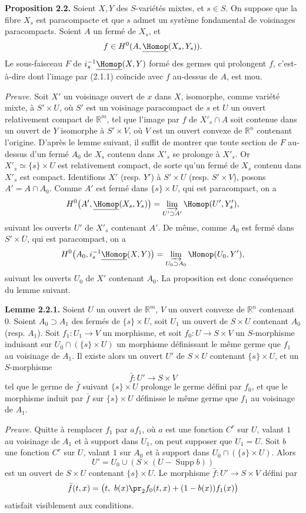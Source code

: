 \documentclass[11pt]{article}
\providecommand{\R}{\mathbb R}
\begin{document}
\textbf{Proposition 2.2.} Soient $X,Y$ des $S$-variétés mixtes, et $s\in S$. On suppose que la fibre $X_s$ est paracompacte et que $s$ admet un système fondamental de voisinages paracompacts. Soient $A$ un fermé de $X_s$, et
\[
  f\in H^0(A,\underline{\Homop}(X_s,Y_s)).
\]
Le sous-faisceau $F$ de $i_s^{-1}\underline{\Homop}(X,Y)$ formé des germes qui prolongent $f$, c'est-à-dire dont l'image par (2.1.1) coïncide avec $f$ au-dessus de $A$, est mou.

\emph{Preuve.} Soit $X'$ un voisinage ouvert de $x$ dans $X$, isomorphe, comme variété mixte, à $S'\times U$, où $S'$ est un voisinage paracompact de $s$ et $U$ un ouvert relativement compact de $\R^m$, tel que l'image par $f$ de $X'_s\cap A$ soit contenue dans un ouvert de $Y$ isomorphe à $S'\times V$, où $V$ est un ouvert convexe de $\R^n$ contenant l'origine. D'après le lemme suivant, il suffit de montrer que toute section de $F$ au-dessus d'un fermé $A_0$ de $X_s$ contenu dans $X'_s$ se prolonge à $X'_s$. Or $X'_s\simeq\{s\}\times U$ est relativement compact, de sorte qu'un fermé de $X_s$ contenu dans $X'_s$ est compact. Identifions $X'$ (resp. $Y'$) à $S'\times U$ (resp. $S'\times V$), posons $A'=A\cap A_0$. Comme $A'$ est fermé dans $\{s\}\times U$, qui est paracompact, on a
\[
  H^0\bigl(A',\underline{\Homop}(X_s,Y_s)\bigr)
  =\varinjlim_{U'\supset A'}\Homop(U',Y'_s),
\]
suivant les ouverts $U'$ de $X'_s$ contenant $A'$. De même, comme $A_0$ est fermé dans $S'\times \overline U$, qui est paracompact, on a
\[
  H^0\bigl(A_0,i_s^{-1}\underline{\Homop}(X,Y)\bigr)
  =\varinjlim_{U_0\supset A_0}\Homop(U_0,Y'),
\]
suivant les ouverts $U_0$ de $X'$ contenant $A_0$. La proposition est donc conséquence du lemme suivant.

\textbf{Lemme 2.2.1.} Soient $U$ un ouvert de $\R^m$, $V$ un ouvert convexe de $\R^n$ contenant $0$. Soient $A_0\supset A_1$ des fermés de $\{s\}\times U$, soit $U_1$ un ouvert de $S\times U$ contenant $A_0$ (resp. $A_1$). Soit $f_1:U_1\to V$ un morphisme, et soit $f_0:U\to S\times V$ un $S$-morphisme induisant sur $U_0\cap(\{s\}\times U)$ un morphisme définissant le même germe que $f_1$ au voisinage de $A_1$. Il existe alors un ouvert $U'$ de $S\times U$ contenant $\{s\}\times U$, et un $S$-morphisme
\[
  \bar f:U'\longrightarrow S\times V
\]
tel que le germe de $\bar f$ suivant $\{s\}\times U$ prolonge le germe défini par $f_0$, et que le morphisme induit par $\bar f$ sur $\{s\}\times U$ définisse le même germe que $f_1$ au voisinage de $A_1$.

\emph{Preuve.} Quitte à remplacer $f_1$ par $af_1$, où $a$ est une fonction $C^r$ sur $U$, valant $1$ au voisinage de $A_1$ et à support dans $U_1$, on peut supposer que $U_1=U$. Soit $b$ une fonction $C^r$ sur $U$, valant $1$ sur $A_0$ et à support dans $U_0\cap(\{s\}\times U)$. Alors
\[
  U'=U_0\cup(S\times(U-\operatorname{Supp}b))
\]
est un ouvert de $S\times U$ contenant $\{s\}\times U$. Le morphisme $\bar f:U'\to S\times V$ défini par
\[
  \bar f(t,x)=\bigl(t,\ b(x)\pr_2f_0(t,x)+(1-b(x))f_1(x)\bigr)
\]
satisfait visiblement aux conditions.
\end{document}
